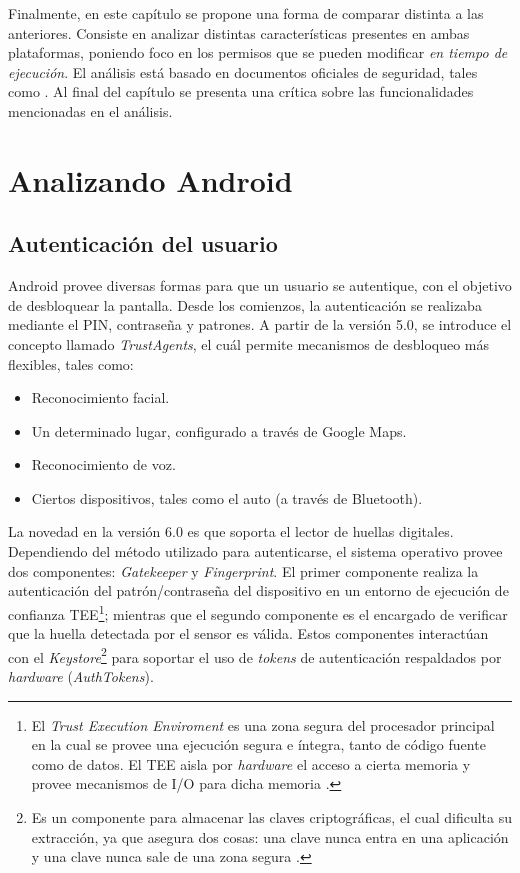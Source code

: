 Finalmente, en este capítulo se propone una forma de comparar distinta a las anteriores. Consiste en analizar distintas características presentes en ambas plataformas, poniendo foco en los permisos que se pueden modificar \emph{en tiempo de ejecución}. El análisis está basado en documentos oficiales de seguridad, tales como \cite{aossec, asreview2015, asg}. Al final del capítulo se presenta una crítica sobre las funcionalidades mencionadas en el análisis.
\section{Analizando Android}
\subsection{Autenticación del usuario}
Android provee diversas formas para que un usuario se autentique, con el objetivo de desbloquear la pantalla. Desde los comienzos, la autenticación se realizaba mediante el PIN, contraseña y patrones. A partir de la versión 5.0, se introduce el concepto llamado \textit{TrustAgents}, el cuál permite mecanismos de desbloqueo más flexibles, tales como:
\begin{itemize}
	\item Reconocimiento facial.
	\item Un determinado lugar, configurado a través de Google Maps.
	\item Reconocimiento de voz.
	\item Ciertos dispositivos, tales como el auto (a través de Bluetooth).
\end{itemize}
La novedad en la versión 6.0 es que soporta el lector de huellas digitales.\\

Dependiendo del método utilizado para autenticarse, el sistema operativo provee dos componentes: \textit{Gatekeeper} y \textit{Fingerprint}. El primer componente realiza la autenticación del patrón/contraseña del dispositivo en un entorno de ejecución de confianza TEE\footnote{El \textit{Trust Execution Enviroment} es una zona segura del procesador principal en la cual se provee una ejecución segura e íntegra, tanto de código fuente como de datos. El TEE aisla por \textit{hardware} el acceso a cierta memoria y provee mecanismos de I/O para dicha memoria \cite{tee2011}.}; mientras que el segundo componente es el encargado de verificar que la huella detectada por el sensor es válida. Estos componentes interactúan con el \textit{Keystore}\footnote{Es un componente para almacenar las claves criptográficas, el cual dificulta su extracción, ya que asegura dos cosas: una clave nunca entra en una aplicación y una clave nunca sale de una zona segura \cite{dakss}.} para soportar el uso de \textit{tokens} de autenticación respaldados por \textit{hardware} (\textit{AuthTokens}).\\

